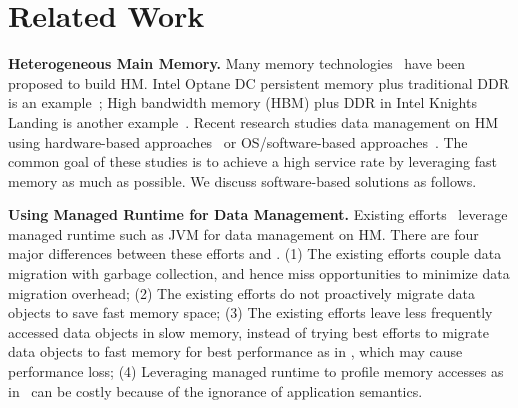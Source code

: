 \section{Related Work}
\textbf{Heterogeneous Main Memory.}
Many memory technologies~\cite{6509675,3DXPoint_intel,Optane:intelweb,ieeemicro10:lee} have been proposed to build HM. Intel Optane DC persistent memory plus traditional DDR is an example~\cite{8641463,optane:ucsd}; High bandwidth memory (HBM) plus DDR in Intel Knights Landing is another example~\cite{6509675}. Recent research studies data management on HM using hardware-based approaches~\cite{asplos15:agarwal,hetero_mem_arch,qureshi_micro09, ibm_isca09,gpu_pcm_pact13,hpdc16:wu,row_buffer_pcm_iccd12, Ramos:ics11} or OS/software-based approaches~\cite{eurosys16:dulloor,nas16:giardino,asplos16:lin,Narayan:IPDPS2018,Peng:ISMM17,ismm16:shen,sc18:wu,wen:ICS18,unimem:sc17,Yan:ASPLOS19,Yu:ics17}. The common goal of these studies is to achieve a high service rate by leveraging fast memory as much as possible. We discuss software-based solutions as follows.

\textbf{Using Managed Runtime for Data Management. }%
Existing efforts~\cite{pldi19:panthera, pldi18:KG,ASPLOS18:Espresso,sigmetrics19:crystalgazer} leverage managed runtime such as JVM for data management on HM. There are four major differences between these efforts and \name. (1) The existing efforts couple data migration with garbage collection, and hence miss opportunities to minimize data migration overhead; (2) The existing efforts do not proactively migrate data objects to save fast memory space; (3) The existing efforts leave less frequently accessed data objects in slow memory, instead of trying best efforts to migrate data objects to fast memory for best performance as in \name, %
which may cause performance loss; (4) Leveraging managed runtime to profile memory accesses as in~\cite{pldi19:panthera, pldi18:KG} can be costly  \textcolor{dong}{because of the ignorance of application semantics}.

